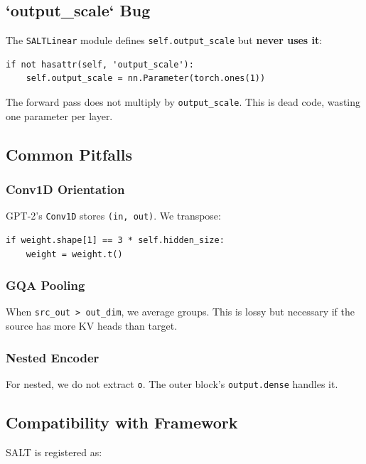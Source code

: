 \subsection{`output\_scale` Bug}

The \texttt{SALTLinear} module defines \texttt{self.output\_scale} but \textbf{never uses it}:

\begin{lstlisting}
if not hasattr(self, 'output_scale'):
    self.output_scale = nn.Parameter(torch.ones(1))
\end{lstlisting}

The forward pass does not multiply by \texttt{output\_scale}. This is dead code, 
wasting one parameter per layer.

\subsection{Common Pitfalls}

\subsubsection{Conv1D Orientation}

GPT-2's \texttt{Conv1D} stores \texttt{(in, out)}. We transpose:

\begin{lstlisting}
if weight.shape[1] == 3 * self.hidden_size:
    weight = weight.t()
\end{lstlisting}

\subsubsection{GQA Pooling}

When \texttt{src\_out > out\_dim}, we average groups. This is lossy but necessary 
if the source has more KV heads than target.

\subsubsection{Nested Encoder}

For nested, we do not extract \texttt{o}. The outer block's \texttt{output.dense} handles it.

\subsection{Compatibility with Framework}

SALT is registered as:

